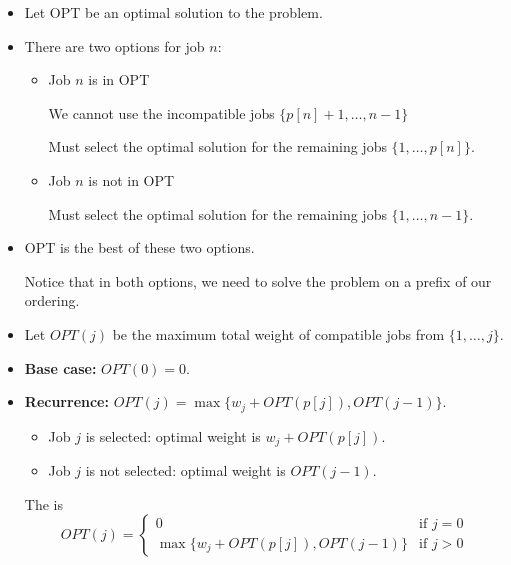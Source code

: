 \begin{itemize}
    \item Let OPT be an optimal solution to the problem.

    \item There are two options for job $n$:

    \begin{itemize}
        \item Job $n$ is in OPT

        We cannot use the incompatible jobs $\{ p[n] + 1, \dots, n - 1 \}$

        Must select the optimal solution for the remaining jobs $\{1, \dots, p[n]\}$.

        \item Job $n$ is not in OPT

        Must select the optimal solution for the remaining jobs $\{1, \dots, n - 1\}$.
    \end{itemize}

    \item OPT is the best of these two options.

    Notice that in both options, we need to solve the problem on a prefix of our ordering.

    \item Let $OPT(j)$ be the maximum total weight of compatible jobs from $\{1, \dots, j\}$.

    \item \textbf{Base case:} $OPT(0) = 0$.

    \item \textbf{Recurrence:} $OPT(j) = \max\{w_j + OPT(p[j]), OPT(j - 1)\}$.

    \begin{itemize}
        \item Job $j$ is selected: optimal weight is $w_j + OPT(p[j])$.
        \item Job $j$ is not selected: optimal weight is $OPT(j - 1)$.
    \end{itemize}

    The  is \[
        OPT(j) = \begin{cases}
            0                                   & \text{if } j = 0 \\
            \max\{w_j + OPT(p[j]), OPT(j - 1)\} & \text{if } j > 0
        \end{cases}
    \]
\end{itemize}

